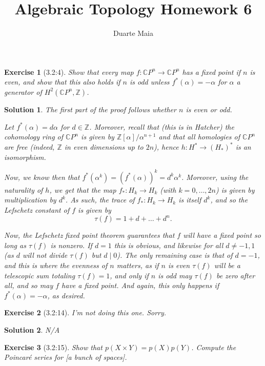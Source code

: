 \documentclass{article}
\title{Algebraic Topology Homework 6}
\author{Duarte Maia}
\theoremstyle{plain}
\newtheorem*{ex}{Exercise}
\theoremstyle{nonumberplain}
\newtheorem{sol}{Solution}
\newcommand{\C}{\mathbb{C}}
\newcommand{\Z}{\mathbb{Z}}
\begin{document}
\maketitle

\begin{ex}[3.2:4]
Show that every map $f \colon \C P^n \to \C P^n$ has a fixed point if $n$ is even, and show that this also holds if $n$ is odd unless $f^*(\alpha) = -\alpha$ for $\alpha$ a generator of $H^2(\C P^n, \Z)$.
\end{ex}

\begin{sol}
The first part of the proof follows whether $n$ is even or odd.

Let $f^*(\alpha) = d \alpha$ for $d \in \Z$. Moreover, recall that (this is in Hatcher) the cohomology ring of $\C P^n$ is given by $\Z[\alpha]/\alpha^{n+1}$ and that all homologies of $\C P^n$ are free (indeed, $\Z$ in even dimensions up to $2n$), hence $h \colon H^* \to (H_*)^*$ is an isomorphism.

Now, we know then that $f^*(\alpha^k) = (f^*(\alpha))^k = d^k \alpha^k$. Moreover, using the naturality of $h$, we get that the map $f_* \colon H_k \to H_k$ (with $k = 0, \dots, 2n$) is given by multiplication by $d^k$. As such, the trace of $f_* \colon H_k \to H_k$ is itself $d^k$, and so the Lefschetz constant of $f$ is given by
\begin{equation}
\tau(f) = 1 + d + \dots + d^n.
\end{equation}

Now, the Lefschetz fixed point theorem guarantees that $f$ will have a fixed point so long as $\tau(f)$ is nonzero. If $d = 1$ this is obvious, and likewise for all $d \neq {-1,1}$ (as $d$ will not divide $\tau(f)$ but $d \mid 0$). The only remaining case is that of $d = -1$, and this is where the evenness of $n$ matters, as if $n$ is even $\tau(f)$ will be a telescopic sum totaling $\tau(f) = 1$, and only if $n$ is odd may $\tau(f)$ be zero after all, and so may $f$ have a fixed point. And again, this only happens if $f^*(\alpha) = -\alpha$, as desired.
\end{sol}

\begin{ex}[3.2:14]
I'm not doing this one. Sorry.
\end{ex}

\begin{sol}
N/A
\end{sol}

\begin{ex}[3.2:15]
Show that $p(X \times Y) = p(X) p(Y)$. Compute the Poincaré series for [a bunch of spaces].
\end{ex}
\end{document}
